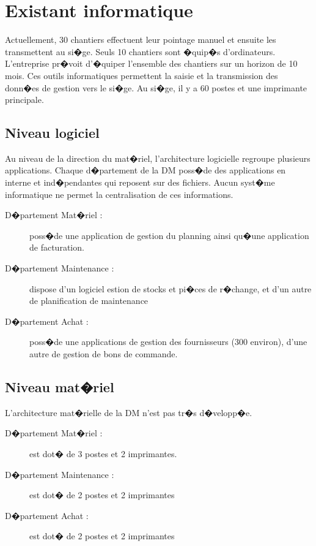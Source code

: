 \documentclass{article}
\begin{document}

\section{Existant informatique}

		Actuellement, 30 chantiers effectuent leur pointage manuel et ensuite les transmettent au si�ge. Seuls 10
chantiers sont �quip�s d'ordinateurs. L'entreprise pr�voit d'�quiper l'ensemble des chantiers sur un horizon de 10 mois. 
Ces outils informatiques permettent la saisie et la transmission des donn�es de gestion vers le si�ge.
		Au si�ge, il y a 60 postes et une imprimante principale.
		
		\subsection{Niveau logiciel}
		
		Au niveau de la direction du mat�riel, l'architecture logicielle regroupe plusieurs applications.
Chaque d�partement de la DM poss�de des applications en interne et ind�pendantes qui reposent sur des fichiers. Aucun syst�me informatique
ne permet la centralisation de ces informations.

		\begin{description}
			\item[D�partement Mat�riel :] poss�de une application de gestion du planning ainsi qu�une application de facturation.
			\item[D�partement Maintenance :] dispose d'un logiciel estion de stocks et pi�ces de r�change, et d'un autre de planification de maintenance
			\item[D�partement Achat :] poss�de une applications de gestion des fournisseurs (300 environ), d'une autre de gestion de bons de commande.
		\end{description}


		\subsection{Niveau mat�riel}

		 L'architecture mat�rielle de la DM n'est pas tr�s d�velopp�e.

		\begin{description}
			\item[D�partement Mat�riel :] est dot� de 3 postes et 2 imprimantes.
			\item[D�partement Maintenance :] est dot� de 2 postes et 2 imprimantes
			\item[D�partement Achat :] est dot� de 2 postes et 2 imprimantes
		\end{description}
		
\end{document}

